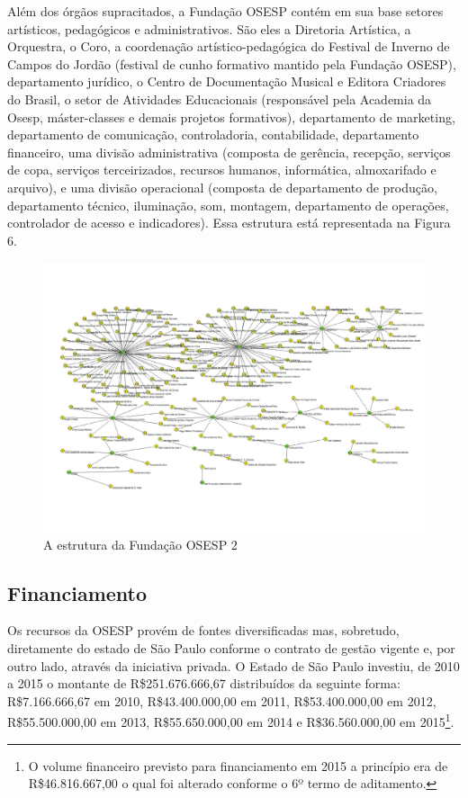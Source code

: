 \documentclass[a4paper, 12pt, openright, oneside, german, french, english, brazil]{abntex2}
\begin{document}
	Além dos órgãos supracitados, a Fundação OSESP contém em sua base setores artísticos, pedagógicos e administrativos. São eles a Diretoria Artística, a Orquestra, o Coro, a coordenação artístico-pedagógica do Festival de Inverno de Campos do Jordão (festival de cunho formativo mantido pela Fundação OSESP), departamento jurídico, o Centro de Documentação Musical e Editora Criadores do Brasil, o setor de Atividades Educacionais (responsável pela Academia da Osesp, máster-classes e demais projetos formativos), departamento de marketing, departamento de comunicação, controladoria, contabilidade, departamento financeiro, uma divisão administrativa (composta de gerência, recepção, serviços de copa, serviços terceirizados, recursos humanos, informática, almoxarifado e arquivo), e uma divisão operacional (composta de departamento de produção, departamento técnico, iluminação, som, montagem, departamento de operações, controlador de acesso e indicadores). Essa estrutura está representada na Figura 6.
	
	\begin{figure}
		\centering
		\caption{A estrutura da Fundação OSESP 2}
		\includegraphics[scale=0.8]{OSESP_setores_pajek.pdf}
	\end{figure}
	
	\subsection{Financiamento}
	
	Os recursos da OSESP provém de fontes diversificadas mas, sobretudo, diretamente do estado de São Paulo conforme o contrato de gestão vigente e, por outro lado, através da iniciativa privada. O Estado de São Paulo investiu, de 2010 a 2015 o montante de R\$251.676.666,67 distribuídos da seguinte forma: R\$7.166.666,67 em 2010, R\$43.400.000,00 em 2011, R\$53.400.000,00 em 2012, R\$55.500.000,00 em 2013, R\$55.650.000,00 em 2014 e R\$36.560.000,00 em 2015\footnote{O volume financeiro previsto para financiamento em 2015 a princípio era de R\$46.816.667,00 o qual foi alterado conforme o 6º termo de aditamento.}.
	
\end{document}
